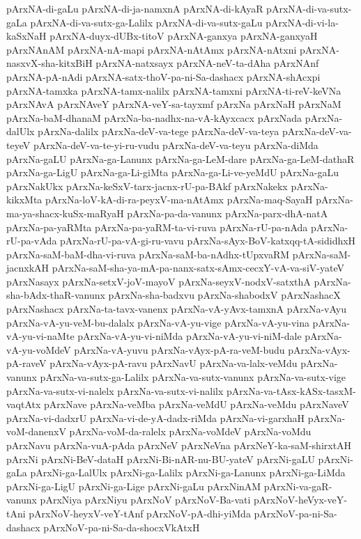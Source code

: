 {pArxNA-di-gaLu
pArxNA-di-ja-namxnA
pArxNA-di-kAyaR
pArxNA-di-va-sutx-gaLa
pArxNA-di-va-sutx-ga-Lalilx
pArxNA-di-va-sutx-gaLu
pArxNA-di-vi-la-kaSxNaH
pArxNA-duyx-dUBx-titoV
pArxNA-ganxya
pArxNA-ganxyaH
pArxNAnAM
pArxNA-nA-mapi
pArxNA-nAtAmx
pArxNA-nAtxni
pArxNA-nasxvX-sha-kitxBiH
pArxNA-natxsayx
pArxNA-neV-ta-dAha
pArxNAnf
pArxNA-pA-nAdi
pArxNA-satx-thoV-pa-ni-Sa-dashacx
pArxNA-shAcxpi
pArxNA-tamxka
pArxNA-tamx-nalilx
pArxNA-tamxni
pArxNA-ti-reV-keVNa
pArxNAvA
pArxNAveY
pArxNA-veY-sa-tayxmf
pArxNa
pArxNaH
pArxNaM
pArxNa-baM-dhanaM
pArxNa-ba-nadhx-na-vA-kAyxcacx
pArxNada
pArxNa-dalUlx
pArxNa-dalilx
pArxNa-deV-va-tege
pArxNa-deV-va-teya
pArxNa-deV-va-teyeV
pArxNa-deV-va-te-yi-ru-vudu
pArxNa-deV-va-teyu
pArxNa-diMda
pArxNa-gaLU
pArxNa-ga-Lanunx
pArxNa-ga-LeM-dare
pArxNa-ga-LeM-dathaR
pArxNa-ga-LigU
pArxNa-ga-Li-giMta
pArxNa-ga-Li-ve-yeMdU
pArxNa-gaLu
pArxNakUkx
pArxNa-keSxV-tarx-jacnx-rU-pa-BAkf
pArxNakekx
pArxNa-kikxMta
pArxNa-loV-kA-di-ra-peyxV-ma-nAtAmx
pArxNa-maq-SayaH
pArxNa-ma-ya-shacx-kuSx-maRyaH
pArxNa-pa-da-vanunx
pArxNa-parx-dhA-natA
pArxNa-pa-yaRMta
pArxNa-pa-yaRM-ta-vi-ruva
pArxNa-rU-pa-nAda
pArxNa-rU-pa-vAda
pArxNa-rU-pa-vA-gi-ru-vavu
pArxNa-sAyx-BoV-katxqq-tA-sididhxH
pArxNa-saM-baM-dha-vi-ruva
pArxNa-saM-ba-nAdhx-tUpxvaRM
pArxNa-saM-jacnxkAH
pArxNa-saM-sha-ya-mA-pa-nanx-satx-sAmx-cecxY-vA-va-siV-yateV
pArxNasayx
pArxNa-setxV-joV-mayoV
pArxNa-seyxV-nodxV-satxthA
pArxNa-sha-bAdx-thaR-vanunx
pArxNa-sha-badxvu
pArxNa-shabodxV
pArxNashacX
pArxNashacx
pArxNa-ta-tavx-vanenx
pArxNa-vA-yAvx-tamxnA
pArxNa-vAyu
pArxNa-vA-yu-veM-bu-dalalx
pArxNa-vA-yu-vige
pArxNa-vA-yu-vina
pArxNa-vA-yu-vi-naMte
pArxNa-vA-yu-vi-niMda
pArxNa-vA-yu-vi-niM-dale
pArxNa-vA-yu-voMdeV
pArxNa-vA-yuvu
pArxNa-vAyx-pA-ra-veM-budu
pArxNa-vAyx-pA-raveV
pArxNa-vAyx-pA-ravu
pArxNavU
pArxNa-va-lalx-veMdu
pArxNa-vanunx
pArxNa-va-sutx-ga-Lalilx
pArxNa-va-sutx-vanunx
pArxNa-va-sutx-vige
pArxNa-va-sutx-vi-nalelx
pArxNa-va-sutx-vi-nalilx
pArxNa-va-tAsx-kASx-tasxM-vaqtAtx
pArxNave
pArxNa-veMba
pArxNa-veMdU
pArxNa-veMdu
pArxNaveV
pArxNa-vi-dadxrU
pArxNa-vi-de-yA-dadx-riMda
pArxNa-vi-garxhaH
pArxNa-voM-danenxV
pArxNa-voM-da-ralelx
pArxNa-voMdeV
pArxNa-voMdu
pArxNavu
pArxNa-vuA-pAda
pArxNeV
pArxNeVna
pArxNeY-ka-saM-shirxtAH
pArxNi
pArxNi-BeV-dataH
pArxNi-Bi-nAR-nu-BU-yateV
pArxNi-gaLU
pArxNi-gaLa
pArxNi-ga-LalUlx
pArxNi-ga-Lalilx
pArxNi-ga-Lanunx
pArxNi-ga-LiMda
pArxNi-ga-LigU
pArxNi-ga-Lige
pArxNi-gaLu
pArxNinAM
pArxNi-va-gaR-vanunx
pArxNiya
pArxNiyu
pArxNoV
pArxNoV-Ba-vati
pArxNoV-heVyx-veY-tAni
pArxNoV-heyxV-veY-tAnf
pArxNoV-pA-dhi-yiMda
pArxNoV-pa-ni-Sa-dashacx
pArxNoV-pa-ni-Sa-da-shocxVkAtxH
}
